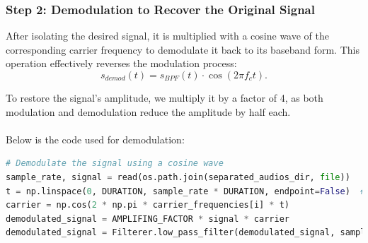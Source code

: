 \documentclass[12pt,a4paper]{article}
\begin{document}
\subsubsection{Step 2: Demodulation to Recover the Original Signal}
After isolating the desired signal, it is multiplied with a cosine wave of the corresponding carrier frequency to demodulate it back to its baseband form. This operation effectively reverses the modulation process:
\[ s_{demod}(t) = s_{BPF}(t) \cdot \cos(2\pi f_c t). \]

To restore the signal's amplitude, we multiply it by a factor of 4, as both modulation and demodulation reduce the amplitude by half each. \\
\\
Below is the code used for demodulation:
\begin{lstlisting}[language=Python, caption=Demodulation Code]
# Demodulate the signal using a cosine wave
sample_rate, signal = read(os.path.join(separated_audios_dir, file))
t = np.linspace(0, DURATION, sample_rate * DURATION, endpoint=False)  # Time vector
carrier = np.cos(2 * np.pi * carrier_frequencies[i] * t)
demodulated_signal = AMPLIFING_FACTOR * signal * carrier
demodulated_signal = Filterer.low_pass_filter(demodulated_signal, sample_rate, LIMIT_FREQUENCY, FilterType.LOW_PASS_BUTTERWORTH)
\end{lstlisting}
\end{document}
